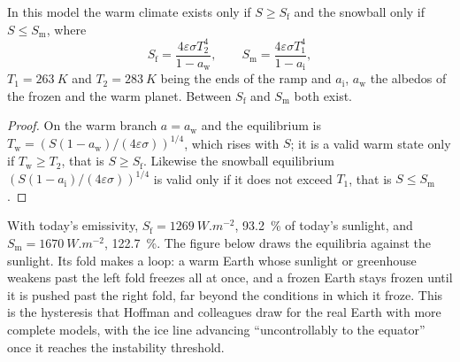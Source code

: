 \begin{proposition}\label{prop:b2:precambrian-earth:tipping}
In this model the warm climate exists only if $S \ge S_{\text{f}}$ and the snowball only if
$S \le S_{\text{m}}$, where
\[
  S_{\text{f}} = \frac{4\varepsilon\sigma T_2^4}{1 - a_{\text{w}}}, \qquad
  S_{\text{m}} = \frac{4\varepsilon\sigma T_1^4}{1 - a_{\text{i}}},
\]
$T_1 = \qty{263}{K}$ and $T_2 = \qty{283}{K}$ being the ends of the ramp and $a_{\text{i}}$,
$a_{\text{w}}$ the albedos of the frozen and the warm planet. Between $S_{\text{f}}$ and
$S_{\text{m}}$ both exist.
\end{proposition}

\begin{proof}
On the warm branch $a = a_{\text{w}}$ and the equilibrium is $T_{\text{w}} = (S(1 -
a_{\text{w}})/(4\varepsilon\sigma))^{1/4}$, which rises with $S$; it is a valid warm state only
if $T_{\text{w}} \ge T_2$, that is $S \ge S_{\text{f}}$. Likewise the snowball equilibrium
$(S(1 - a_{\text{i}})/(4\varepsilon\sigma))^{1/4}$ is valid only if it does not exceed $T_1$, that
is $S \le S_{\text{m}}$.
\end{proof}

With today's emissivity, $S_{\text{f}} = \qty{1269}{W.m^{-2}}$, \qty{93.2}{\percent} of today's
sunlight, and $S_{\text{m}} = \qty{1670}{W.m^{-2}}$, \qty{122.7}{\percent}. The figure below
draws the equilibria against the sunlight. Its fold makes a loop: a warm Earth whose sunlight
or greenhouse weakens past the left fold freezes all at once, and a frozen Earth stays frozen
until it is pushed past the right fold, far beyond the conditions in which it froze. This is
the hysteresis that Hoffman and colleagues draw for the real Earth with more complete models,
with the ice line advancing ``uncontrollably to the equator'' once it reaches the instability
threshold.

